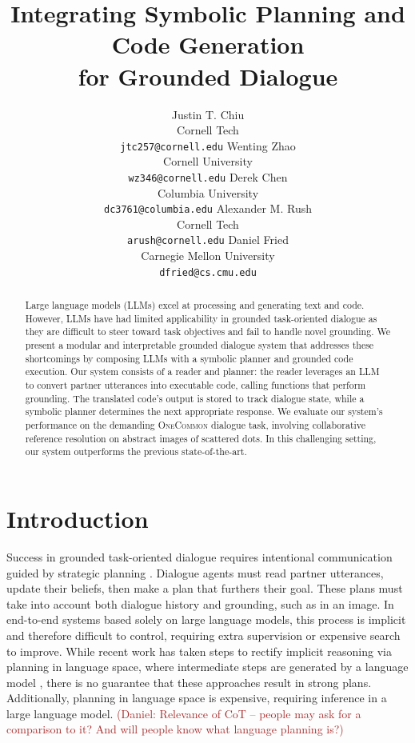 \documentclass[11pt]{article}
\title{
Integrating Symbolic Planning and Code Generation\\
for Grounded Dialogue
}
\author{
Justin T. Chiu  \\
Cornell Tech \\
\texttt{jtc257@cornell.edu}
\And
Wenting Zhao \\
Cornell University \\
\texttt{wz346@cornell.edu}
\And
Derek Chen \\
Columbia University \\
\texttt{dc3761@columbia.edu}
\And
Alexander M. Rush \\
Cornell Tech \\
\texttt{arush@cornell.edu}
\And
Daniel Fried \\
Carnegie Mellon University \\
\texttt{dfried@cs.cmu.edu} 
}
\newcommand{\daniel}[1]{{{\textcolor{brown}{(Daniel: #1)}}}}
\begin{document}
\maketitle
\begin{abstract}
Large language models (LLMs) excel at processing and generating text and code. However, LLMs have had limited applicability in grounded task-oriented dialogue as they are difficult to steer toward task objectives and fail to handle novel grounding. We present a modular and interpretable grounded dialogue system that addresses these shortcomings by composing LLMs with a symbolic planner and grounded code execution. Our system consists of a reader and planner: the reader leverages an LLM to convert partner utterances into executable code, calling functions that perform grounding. The translated code's output is stored to track dialogue state, while a symbolic planner determines the next appropriate response. We evaluate our system's performance on the demanding \textsc{OneCommon} dialogue task, involving collaborative reference resolution on abstract images of scattered dots. In this challenging setting, our system outperforms the previous state-of-the-art.
\end{abstract}

\section{Introduction}
Success in grounded task-oriented dialogue requires intentional communication guided by strategic planning \citep{cicero}.
Dialogue agents must read partner utterances, update their beliefs, then make a plan that furthers their goal.
These plans must take into account both dialogue history and grounding, such as in an image.
In end-to-end systems based solely on large language models,
this process is implicit and therefore difficult to control,
requiring extra supervision \citep{rlhf} or expensive search \citep{astaresque} to improve.
While recent work has taken steps to rectify implicit reasoning via
planning in language space, 
where intermediate steps are generated by a language model \citep{cot},
there is no guarantee that these approaches result in strong plans.
Additionally, planning in language space is expensive,
requiring inference in a large language model.
\daniel{Relevance of CoT -- people may ask for a comparison to it? And will people know what language planning is?}
\end{document}
